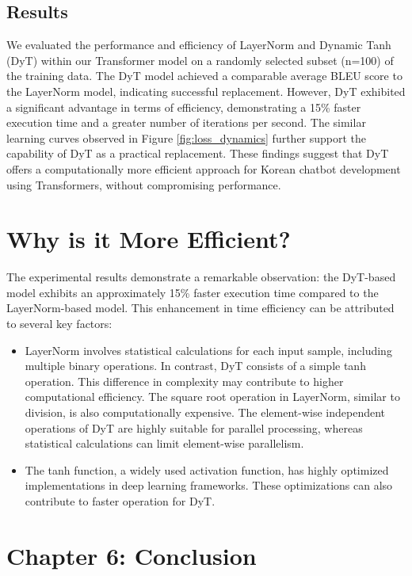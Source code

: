 \documentclass{article}
\begin{document}
\subsection{Results}
We evaluated the performance and efficiency of LayerNorm and Dynamic Tanh (DyT) within our Transformer model on a randomly selected subset (n=100) of the training data. The DyT model achieved a comparable average BLEU score to the LayerNorm model, indicating successful replacement. However, DyT exhibited a significant advantage in terms of efficiency, demonstrating a 15\% faster execution time and a greater number of iterations per second. The similar learning curves observed in Figure \ref{fig:loss_dynamics} further support the capability of DyT as a practical replacement. These findings suggest that DyT offers a computationally more efficient approach for Korean chatbot development using Transformers, without compromising performance.

\section{Why is it More Efficient?}

The experimental results demonstrate a remarkable observation: the DyT-based model exhibits an approximately 15\% faster execution time compared to the LayerNorm-based model. This enhancement in time efficiency can be attributed to several key factors:

\begin{itemize}
    \item LayerNorm involves statistical calculations for each input sample, including multiple binary operations. In contrast, DyT consists of a simple tanh operation. This difference in complexity may contribute to higher computational efficiency. The square root operation in LayerNorm, similar to division, is also computationally expensive. The element-wise independent operations of DyT are highly suitable for parallel processing, whereas statistical calculations can limit element-wise parallelism.
    \item The tanh function, a widely used activation function, has highly optimized implementations in deep learning frameworks. These optimizations can also contribute to faster operation for DyT.
\end{itemize}

\section{Chapter 6: Conclusion}
\end{document}
